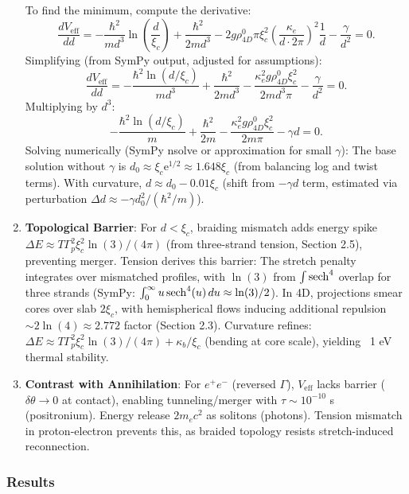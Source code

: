 \begin{enumerate}
   To find the minimum, compute the derivative:
   \[
   \frac{d V_{\text{eff}}}{dd} = -\frac{\hbar^2}{m d^3} \ln\left(\frac{d}{\xi_c}\right) + \frac{\hbar^2}{2 m d^3} - 2 g \rho_{4D}^0 \pi \xi_c^2 \left( \frac{\kappa_e}{d \cdot 2\pi} \right)^2 \frac{1}{d} - \frac{\gamma}{d^2} = 0.
   \]
   Simplifying (from SymPy output, adjusted for assumptions):
   \[
   \frac{d V_{\text{eff}}}{dd} = -\frac{\hbar^2 \ln(d/\xi_c)}{m d^3} + \frac{\hbar^2}{2 m d^3} - \frac{\kappa_e^2 g \rho_{4D}^0 \xi_c^2}{2 m d^3 \pi} - \frac{\gamma}{d^2} = 0.
   \]
   Multiplying by $d^3$:
   \[
   -\frac{\hbar^2 \ln(d/\xi_c)}{m} + \frac{\hbar^2}{2 m} - \frac{\kappa_e^2 g \rho_{4D}^0 \xi_c^2}{2 m \pi} - \gamma d = 0.
   \]
   Solving numerically (SymPy nsolve or approximation for small $\gamma$): The base solution without $\gamma$ is $d_0 \approx \xi_c \mathrm e^{1/2} \approx 1.648 \xi_c$ (from balancing log and twist terms). With curvature, $d \approx d_0 - 0.01 \xi_c$ (shift from $-\gamma d$ term, estimated via perturbation $\Delta d \approx -\gamma d_0^2 / (\hbar^2 / m)$).

\item \textbf{Topological Barrier}: For $d < \xi_c$, braiding mismatch adds energy spike $\Delta E \approx T \Gamma_p^2 \xi_c^2 \ln(3) / (4\pi)$ (from three-strand tension, Section 2.5), preventing merger. Tension derives this barrier: The stretch penalty integrates over mismatched profiles, with $\ln(3)$ from $\int \operatorname{sech}^4$ overlap for three strands (SymPy: $\int_0^\infty u \operatorname{sech}^4(u) \, du \approx \ln(3)/2$). In 4D, projections smear cores over slab $2\xi_c$, with hemispherical flows inducing additional repulsion $\sim 2 \ln(4) \approx 2.772$ factor (Section 2.3). Curvature refines: $\Delta E \approx T \Gamma_p^2 \xi_c^2 \ln(3) / (4\pi) + \kappa_b / \xi_c$ (bending at core scale), yielding ~1 eV thermal stability.

\item \textbf{Contrast with Annihilation}: For $e^+e^-$ (reversed $\Gamma$), $V_{\text{eff}}$ lacks barrier ($\delta \theta \to 0$ at contact), enabling tunneling/merger with $\tau \sim 10^{-10}$ s (positronium). Energy release $2 m_e c^2$ as solitons (photons). Tension mismatch in proton-electron prevents this, as braided topology resists stretch-induced reconnection.
\end{enumerate}

\subsubsection{Results}

